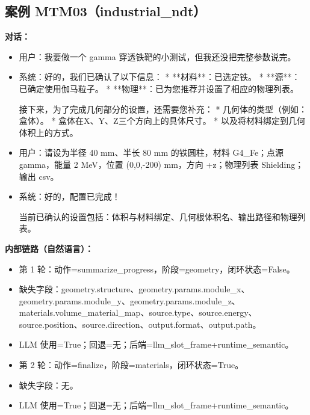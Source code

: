 \documentclass[11pt]{ctexart}
\begin{document}
\subsection{案例 MTM03（industrial\_ndt）}
\textbf{对话：}
\begin{itemize}
\item 用户：我要做一个 gamma 穿透铁靶的小测试，但我还没把完整参数说完。
\item 系统：好的，我们已确认了以下信息：
*   **材料**：已选定铁。
*   **源**：已确定使用伽马粒子。
*   **物理**：已为您推荐并设置了相应的物理列表。

接下来，为了完成几何部分的设置，还需要您补充：
*   几何体的类型（例如：盒体）。
*   盒体在X、Y、Z三个方向上的具体尺寸。
*   以及将材料绑定到几何体积上的方式。
\item 用户：请设为半径 40 mm、半长 80 mm 的铁圆柱，材料 G4\_Fe；点源 gamma，能量 2 MeV，位置 (0,0,-200) mm，方向 +z；物理列表 Shielding；输出 csv。
\item 系统：好的，配置已完成！

当前已确认的设置包括：体积与材料绑定、几何根体积名、输出路径和物理列表。
\end{itemize}
\textbf{内部链路（自然语言）：}
\begin{itemize}
\item 第 1 轮：动作=summarize\_progress，阶段=geometry，闭环状态=False。
\item 缺失字段：geometry.structure、geometry.params.module\_x、geometry.params.module\_y、geometry.params.module\_z、materials.volume\_material\_map、source.type、source.energy、source.position、source.direction、output.format、output.path。
\item LLM 使用=True；回退=无；后端=llm\_slot\_frame+runtime\_semantic。
\item 第 2 轮：动作=finalize，阶段=materials，闭环状态=True。
\item 缺失字段：无。
\item LLM 使用=True；回退=无；后端=llm\_slot\_frame+runtime\_semantic。
\end{itemize}
\end{document}
